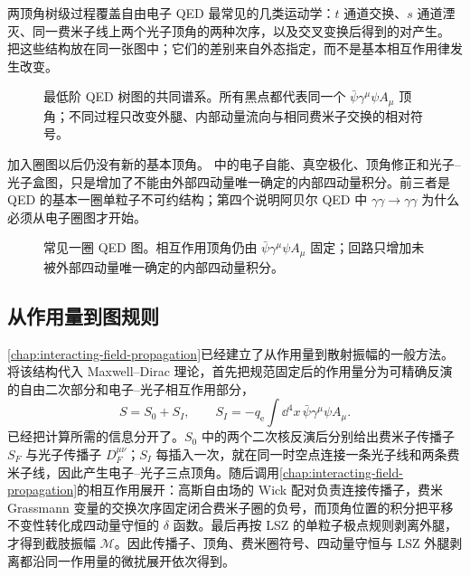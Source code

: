 两顶角树级过程覆盖自由电子 QED 最常见的几类运动学：$t$ 通道交换、$s$ 通道湮灭、同一费米子线上两个光子顶角的两种次序，以及交叉变换后得到的对产生。 把这些结构放在同一张图中；它们的差别来自外态指定，而不是基本相互作用律发生改变。

\begin{figure}[htbp]
 \centering
 
 \caption{最低阶 QED 树图的共同谱系。所有黑点都代表同一个 $\bar\psi\gamma^\mu\psi A_\mu$ 顶角；不同过程只改变外腿、内部动量流向与相同费米子交换的相对符号。}
 \label{fig:qed-tree-atlas-dp7}
\end{figure}

加入圈图以后仍没有新的基本顶角。 中的电子自能、真空极化、顶角修正和光子--光子盒图，只是增加了不能由外部四动量唯一确定的内部四动量积分。前三者是 QED 的基本一圈单粒子不可约结构；第四个说明阿贝尔 QED 中 $\gamma\gamma\to\gamma\gamma$ 为什么必须从电子圈图才开始。

\begin{figure}[htbp]
 \centering
 
 \caption{常见一圈 QED 图。相互作用顶角仍由 $\bar\psi\gamma^\mu\psi A_\mu$ 固定；回路只增加未被外部四动量唯一确定的内部四动量积分。}
 \label{fig:qed-loop-atlas-dp7}
\end{figure}

\subsection{从作用量到图规则}

\cref{chap:interacting-field-propagation}已经建立了从作用量到散射振幅的一般方法。将该结构代入 Maxwell--Dirac 理论，首先把规范固定后的作用量分为可精确反演的自由二次部分和电子--光子相互作用部分，
\begin{equation}
 S=S_0+S_I,
 \qquad
 S_I=-q_{\mathrm e}\int\dd^4 x\,\bar\psi\gamma^\mu\psi A_\mu.
 \label{eq:qed-action-to-diagram-mainline-dp7}
\end{equation}
 已经把计算所需的信息分开了。$S_0$ 中的两个二次核反演后分别给出费米子传播子 $S_F$ 与光子传播子 $D_F^{\mu\nu}$；$S_I$ 每插入一次，就在同一时空点连接一条光子线和两条费米子线，因此产生电子--光子三点顶角。随后调用\cref{chap:interacting-field-propagation}的相互作用展开：高斯自由场的 Wick 配对负责连接传播子，费米 Grassmann 变量的交换次序固定闭合费米子圈的负号，而顶角位置的积分把平移不变性转化成四动量守恒的 $\delta$ 函数。最后再按 LSZ 的单粒子极点规则剥离外腿，才得到截肢振幅 $\mathcal M$。因此传播子、顶角、费米圈符号、四动量守恒与 LSZ 外腿剥离都沿同一作用量的微扰展开依次得到。

